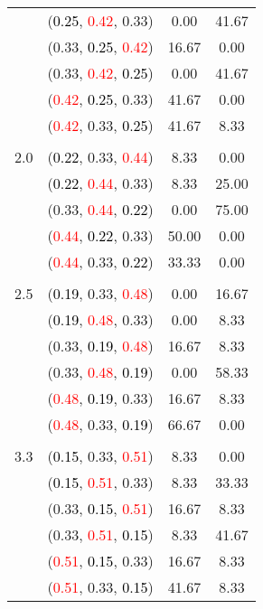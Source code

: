 \documentclass[10pt,a4paper]{report}
\begin{document}
\begin{center}
\begin{longtable}{clcc}
			&(\textcolor{black}{0.25}, \textcolor{red}{0.42}, 0.33)&0.00&41.67\\
			&(0.33, \textcolor{black}{0.25}, \textcolor{red}{0.42})&16.67&0.00\\
			&(0.33, \textcolor{red}{0.42}, \textcolor{black}{0.25})&0.00&41.67\\
			&(\textcolor{red}{0.42}, \textcolor{black}{0.25}, 0.33)&41.67&0.00\\
			&(\textcolor{red}{0.42}, 0.33, \textcolor{black}{0.25})&41.67&8.33\\
		&&&\\
		2.0			&(\textcolor{black}{0.22}, 0.33, \textcolor{red}{0.44})&8.33&0.00\\
			&(\textcolor{black}{0.22}, \textcolor{red}{0.44}, 0.33)&8.33&25.00\\
			&(0.33, \textcolor{red}{0.44}, \textcolor{black}{0.22})&0.00&75.00\\
			&(\textcolor{red}{0.44}, \textcolor{black}{0.22}, 0.33)&50.00&0.00\\
			&(\textcolor{red}{0.44}, 0.33, \textcolor{black}{0.22})&33.33&0.00\\
		&&&\\
		2.5			&(\textcolor{black}{0.19}, 0.33, \textcolor{red}{0.48})&0.00&16.67\\
			&(\textcolor{black}{0.19}, \textcolor{red}{0.48}, 0.33)&0.00&8.33\\
			&(0.33, \textcolor{black}{0.19}, \textcolor{red}{0.48})&16.67&8.33\\
			&(0.33, \textcolor{red}{0.48}, \textcolor{black}{0.19})&0.00&58.33\\
			&(\textcolor{red}{0.48}, \textcolor{black}{0.19}, 0.33)&16.67&8.33\\
			&(\textcolor{red}{0.48}, 0.33, \textcolor{black}{0.19})&66.67&0.00\\
		&&&\\
		3.3			&(\textcolor{black}{0.15}, 0.33, \textcolor{red}{0.51})&8.33&0.00\\
			&(\textcolor{black}{0.15}, \textcolor{red}{0.51}, 0.33)&8.33&33.33\\
			&(0.33, \textcolor{black}{0.15}, \textcolor{red}{0.51})&16.67&8.33\\
			&(0.33, \textcolor{red}{0.51}, \textcolor{black}{0.15})&8.33&41.67\\
			&(\textcolor{red}{0.51}, \textcolor{black}{0.15}, 0.33)&16.67&8.33\\
			&(\textcolor{red}{0.51}, 0.33, \textcolor{black}{0.15})&41.67&8.33\\
		\bottomrule
	\end{longtable}
\end{center}
\end{document}
